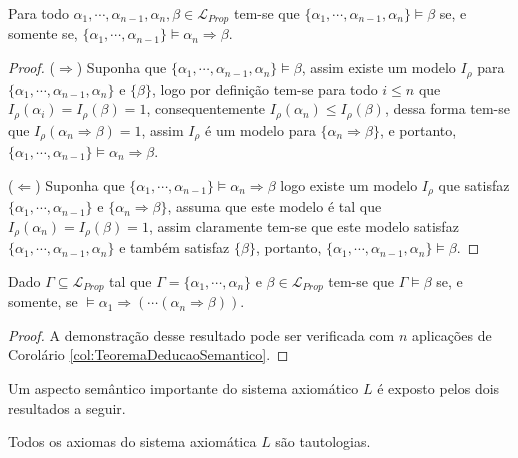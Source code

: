 \begin{corollary}\label{col:TeoremaDeducaoSemantico}
    Para todo $\alpha_1, \cdots, \alpha_{n-1}, \alpha_n, \beta \in \mathcal{L}_{Prop}$ tem-se que $\{\alpha_1, \cdots, \alpha_{n-1}, \alpha_n\} \vDash \beta$ se, e somente se, $\{\alpha_1, \cdots, \alpha_{n-1}\} \vDash \alpha_n \Rightarrow \beta$.
\end{corollary}

\begin{proof}
     ($\Rightarrow$) Suponha que $\{\alpha_1, \cdots, \alpha_{n-1}, \alpha_n\} \vDash \beta$, assim existe um modelo $I_\rho$ para $\{\alpha_1, \cdots, \alpha_{n-1}, \alpha_n\}$ e $\{\beta\}$, logo por definição tem-se para todo $i \leq n$ que $I_\rho(\alpha_i) = I_\rho(\beta) = 1$, consequentemente $I_\rho(\alpha_n) \leq I_\rho(\beta)$, dessa forma tem-se que $I_\rho(\alpha_n \Rightarrow \beta) = 1$, assim $I_\rho$ é um modelo para $\{\alpha_n \Rightarrow \beta\}$, e portanto, $\{\alpha_1, \cdots, \alpha_{n-1}\} \vDash \alpha_n \Rightarrow \beta$.
     
     ($\Leftarrow$) Suponha que  $\{\alpha_1, \cdots, \alpha_{n-1}\} \vDash \alpha_n \Rightarrow \beta$ logo existe um modelo $I_\rho$ que satisfaz $\{\alpha_1, \cdots, \alpha_{n-1}\} $ e $\{\alpha_n \Rightarrow \beta\}$, assuma que este modelo é tal que $I_\rho(\alpha_n) = I_\rho(\beta) = 1$, assim claramente tem-se que este modelo satisfaz $\{\alpha_1, \cdots, \alpha_{n-1}, \alpha_n\}$ e também satisfaz $\{\beta\}$, portanto, $\{\alpha_1, \cdots, \alpha_{n-1}, \alpha_n\} \vDash \beta$.
\end{proof}

\begin{prop}\label{prop:DeducaoSemantica}
    Dado $\Gamma \subseteq \mathcal{L}_{Prop}$ tal que $\Gamma = \{\alpha_1, \cdots, \alpha_n\}$ e $\beta \in \mathcal{L}_{Prop}$ tem-se que $\Gamma \vDash \beta$ se, e somente, se $\vDash \alpha_1 \Rightarrow ( \cdots ( \alpha_n \Rightarrow \beta))$.
\end{prop}

\begin{proof}
    A demonstração desse resultado pode ser verificada com $n$ aplicações de Corolário \ref{col:TeoremaDeducaoSemantico}.
\end{proof}

Um aspecto semântico importante do sistema axiomático $L$ é exposto pelos dois resultados a seguir.

\begin{theorem}\label{teo:AxiomasTautologiaEmL}
    Todos os axiomas do sistema axiomática $L$ são tautologias.
\end{theorem}


